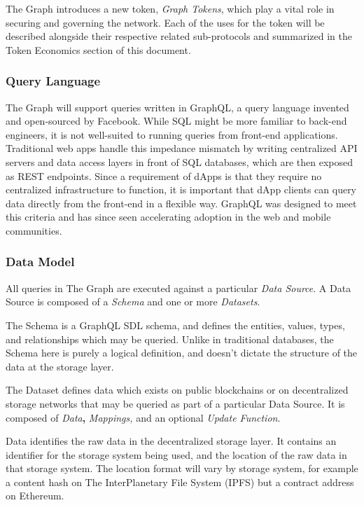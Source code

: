\documentclass[12pt]{article}
\begin{document}
The Graph introduces a new token, \textit{Graph Tokens}, which play a vital role
in securing and governing the network. Each of the uses for the token will be
described alongside their respective related sub-protocols and summarized in the
Token Economics section of this document.

\subsubsection*{Query Language}

The Graph will support queries written in GraphQL, a query language invented and
open-sourced by Facebook. While SQL might be more familiar to back-end
engineers, it is not well-suited to running queries from front-end applications.
Traditional web apps handle this impedance mismatch by writing centralized API
servers and data access layers in front of SQL databases, which are then exposed
as REST endpoints. Since a requirement of dApps is that they require no
centralized infrastructure to function, it is important that dApp clients can
query data directly from the front-end in a flexible way. GraphQL was designed
to meet this criteria and has since seen accelerating adoption in the web and
mobile communities.

\subsubsection*{Data Model}

All queries in The Graph are executed against a particular \textit{Data Source}.
A Data Source is composed of a \textit{Schema} and one or more
\textit{Datasets}.

The Schema is a GraphQL SDL schema, and defines the entities, values, types, and
relationships which may be queried. Unlike in traditional databases, the Schema
here is purely a logical definition, and doesn't dictate the structure of the
data at the storage layer.

The Dataset defines data which exists on public blockchains or on decentralized
storage networks that may be queried as part of a particular Data Source. It is
composed of \textit{Data}\textbf{,} \textit{Mappings,} and an optional
\textit{Update Function}.

Data identifies the raw data in the decentralized storage layer. It contains an
identifier for the storage system being used, and the location of the raw data
in that storage system. The location format will vary by storage system, for
example a content hash on The InterPlanetary File System (IPFS) but a contract
address on Ethereum.
\end{document}

